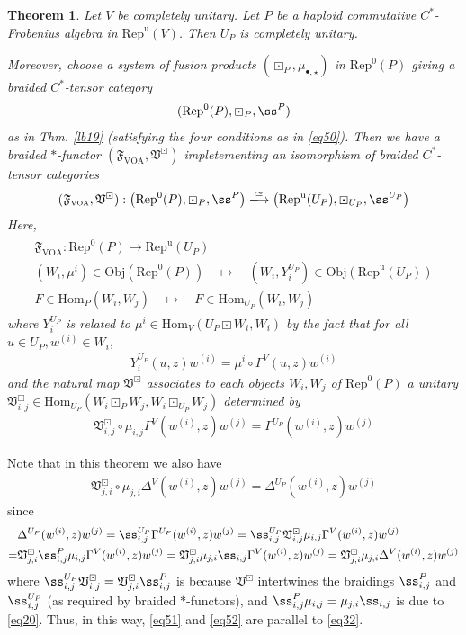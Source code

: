 \documentclass[11pt,b5paper,notitlepage]{article}
\theoremstyle{definition}
\theoremstyle{plain}
\newtheorem{thm}[df]{Theorem}
\newcommand{\fk}{\mathfrak}
\newcommand{\Hom}{\mathrm{Hom}}
\newcommand{\Rep}{\mathrm{Rep}}
\newcommand{\uni}{\mathrm{u}}
\newcommand{\RepV}{{\mathrm{Rep}^\uni(V)}}
\newcommand{\blt}{\bullet}
\newcommand{\Obj}{\mathrm{Obj}}
\newcommand{\VOA}{{\scriptscriptstyle \mathrm{VOA}}}
\newcommand{\RepUP}{\mathrm{Rep}^{\mathrm u}(U_P)}
\numberwithin{equation}{section}
\begin{document}
\begin{thm}\label{lb67}
Let $V$ be completely unitary. Let $P$ be a haploid commutative $C^*$-Frobenius algebra in $\RepV$. Then $U_P$ is completely unitary.

Moreover, choose a system of fusion products $(\boxdot_P,\mu_{\blt,\star})$ in $\Rep^0(P)$ giving a braided $C^*$-tensor category
\begin{align*}
(\Rep^0(P),\boxdot_P,\ss^P)
\end{align*}
as in Thm. \ref{lb19} (satisfying the four conditions as in \eqref{eq50}). Then we have a braided $*$-functor $(\fk F_\VOA,\fk V^\boxdot)$ impletementing an isomorphism of braided $C^*$-tensor categories
\begin{align*}
(\fk F_\VOA,\fk V^\boxdot):\big(\Rep^0(P),\boxdot_P,\ss^P \big)\xlongrightarrow{\simeq}\big(\RepUP,\boxdot_{U_P},\ss^{U_P}\big)
\end{align*}
Here,
\begin{gather}\label{eq54}
\begin{gathered}
\fk F_\VOA:\Rep^0(P)\rightarrow\RepUP\\
(W_i,\mu^i)\in\Obj(\Rep^0(P))\quad\mapsto\quad (W_i,Y^{U_P}_i)\in\Obj(\RepUP)\\
F\in\Hom_P(W_i,W_j)\quad\mapsto\quad F\in\Hom_{U_P}(W_i,W_j)
\end{gathered}
\end{gather}
where $Y_i^{U_P}$ is related to $\mu^i\in\Hom_V(U_P\boxdot W_i,W_i)$ by the fact that for all $u\in U_P,w^{(i)}\in W_i$,
\begin{align}
Y_i^{U_P}(u,z)w^{(i)}=\mu^i\circ\Gamma^V(u,z)w^{(i)}
\end{align}
and the natural map $\fk V^{\boxdot}$ associates to each objects $W_i,W_j$ of $\Rep^0(P)$ a unitary $\fk V^\boxdot_{i,j}\in\Hom_{U_P}(W_i\boxdot_P W_j, W_i\boxdot_{U_P}W_j)$ determined by
\begin{gather}\label{eq51}
\fk V^\boxdot_{i,j}\circ\mu_{i,j}\Gamma^V(w^{(i)},z) w^{(j)}=\Gamma^{U_P}(w^{(i)},z)w^{(j)}
\end{gather}
\end{thm}

Note that in this theorem we also have
\begin{gather}\label{eq52}
\fk V^\boxdot_{j,i}\circ\mu_{j,i}\Delta^V(w^{(i)},z) w^{(j)}=\Delta^{U_P}(w^{(i)},z)w^{(j)}
\end{gather}
since
\begin{align*}
&\Delta^{U_P}(w^{(i)},z)w^{(j)}=\ss^{U_P}_{i,j}\Gamma^{U_P}(w^{(i)},z)w^{(j)}=\ss^{U_P}_{i,j}\fk V^\boxdot_{i,j}\mu_{i,j}\Gamma^V(w^{(i)},z) w^{(j)}\\
=&\fk V^\boxdot_{j,i}\ss^P_{i,j}\mu_{i,j}\Gamma^V(w^{(i)},z) w^{(j)}=\fk V^\boxdot_{j,i}\mu_{j,i}\ss_{i,j}\Gamma^V(w^{(i)},z) w^{(j)}=\fk V^\boxdot_{j,i}\mu_{j,i}\Delta^V(w^{(i)},z) w^{(j)}
\end{align*}
where $\ss^{U_P}_{i,j}\fk V^\boxdot_{i,j}=\fk V^\boxdot_{j,i}\ss^P_{i,j}$ is because $\fk V^\boxdot$ intertwines the braidings $\ss^P_{i,j}$ and $\ss^{U_P}_{i,j}$ (as required by braided $*$-functors), and $\ss^P_{i,j}\mu_{i,j}=\mu_{j,i}\ss_{i,j}$ is due to \eqref{eq20}. Thus, in this way, \eqref{eq51} and \eqref{eq52} are parallel to \eqref{eq32}.
\end{document}
